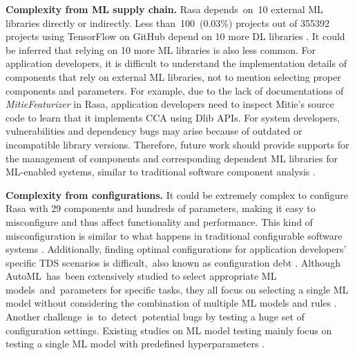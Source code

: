 \textbf{Complexity from ML supply chain.} Rasa depends~on~10 external ML libraries directly or indirectly. Less than~100~(0.03\%) projects out of 355392 projects using TensorFlow on GitHub depend on 10 more DL libraries \cite{supply_chain}. It could be inferred that relying on 10 more ML libraries is also less common.
For application developers, it is difficult to understand the implementation details of components that rely on external ML libraries, not to mention selecting proper components and parameters. For example, due to the lack of documentations of \textit{MitieFeaturizer} in Rasa, application developers need to inspect Mitie's source code to learn that it implements CCA using Dlib APIs. 
For system developers, vulnerabilities \cite{npm_technical_lag} and dependency bugs \cite{dependency_bug} may arise because of outdated or incompatible library versions. 
Therefore, future work should provide supports for the management of components and corresponding dependent ML libraries for ML-enabled systems, similar to traditional software component analysis \cite{Foo2019TheDO}.

\textbf{Complexity from configurations.} It could be extremely complex to configure Rasa with 29 components and hundreds of parameters, making it easy to misconfigure and thus affect functionality and performance. This kind of misconfiguration is similar to what happens in traditional configurable software systems \cite{configurable_system}. Additionally, finding optimal configurations for application developers' specific TDS scenarios is difficult,~also known as configuration debt \cite{hidden_technical_debt}. Although AutoML~has~been extensively studied to select appropriate ML models~and~parameters for specific tasks, they all focus on selecting a single ML model without considering the combination of multiple ML models and rules  \cite{XinHe2021AutoMLAS}. Another challenge~is~to~detect~potential bugs by testing a huge set of configuration settings. Existing studies on ML model testing mainly focus on testing a single ML model with predefined hyperparameters \cite{ml_testing}.
 
